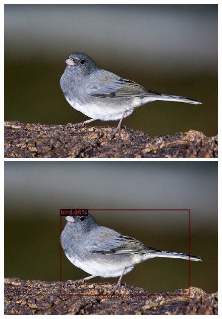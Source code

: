 \documentclass{article}
\begin{document}
\begin{figure}[h!]
  \centering
  \begin{minipage}{0.33\textwidth}
  \includegraphics[width=\textwidth, height=0.17\textheight]{./../../final_results/Pascal/000148_1shot.png}
  \end{minipage}
  \begin{minipage}{0.33\textwidth}
  \includegraphics[width=\textwidth, height=0.17\textheight]{./../../final_results/Pascal/000148_5shot.png}
  \end{minipage}
  \begin{minipage}{0.31\textwidth}

\end{minipage}
\end{figure}
\end{document}
